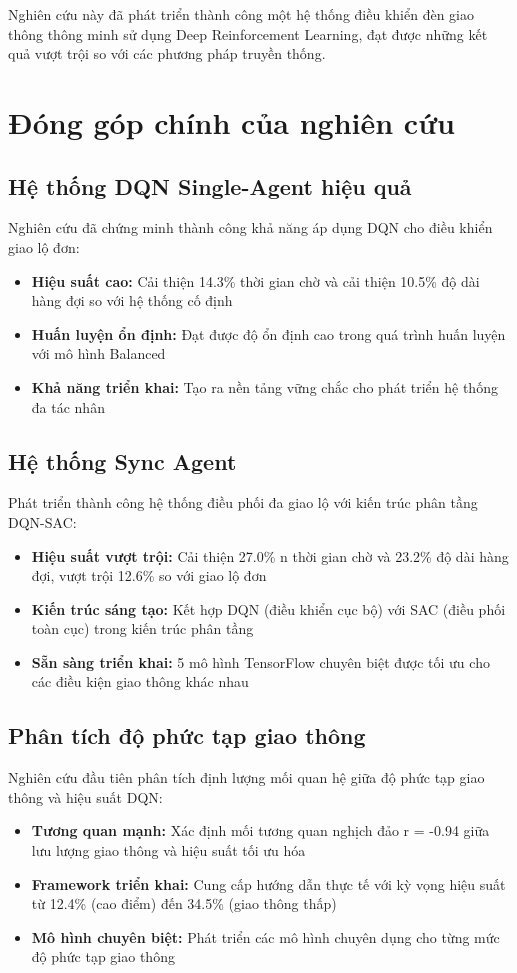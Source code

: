 Nghiên cứu này đã phát triển thành công một hệ thống điều khiển đèn giao thông thông minh sử dụng Deep Reinforcement Learning, đạt được những kết quả vượt trội so với các phương pháp truyền thống.

\section{Đóng góp chính của nghiên cứu}

\subsection{Hệ thống DQN Single-Agent hiệu quả}
Nghiên cứu đã chứng minh thành công khả năng áp dụng DQN cho điều khiển giao lộ đơn:
\begin{itemize}
    \item \textbf{Hiệu suất cao:} Cải thiện 14.3\% thời gian chờ và cải thiện 10.5\% độ dài hàng đợi so với hệ thống cố định
    \item \textbf{Huấn luyện ổn định:} Đạt được độ ổn định cao trong quá trình huấn luyện với mô hình Balanced
    \item \textbf{Khả năng triển khai:} Tạo ra nền tảng vững chắc cho phát triển hệ thống đa tác nhân
\end{itemize}

\subsection{Hệ thống Sync Agent}
Phát triển thành công hệ thống điều phối đa giao lộ với kiến trúc phân tầng DQN-SAC:
\begin{itemize}
    \item \textbf{Hiệu suất vượt trội:} Cải thiện 27.0\% n thời gian chờ và 23.2\% độ dài hàng đợi, vượt trội 12.6\% so với giao lộ đơn
    \item \textbf{Kiến trúc sáng tạo:} Kết hợp DQN (điều khiển cục bộ) với SAC (điều phối toàn cục) trong kiến trúc phân tầng
    \item \textbf{Sẵn sàng triển khai:} 5 mô hình TensorFlow chuyên biệt được tối ưu cho các điều kiện giao thông khác nhau
\end{itemize}

\subsection{Phân tích độ phức tạp giao thông}
Nghiên cứu đầu tiên phân tích định lượng mối quan hệ giữa độ phức tạp giao thông và hiệu suất DQN:
\begin{itemize}
    \item \textbf{Tương quan mạnh:} Xác định mối tương quan nghịch đảo r = -0.94 giữa lưu lượng giao thông và hiệu suất tối ưu hóa
    \item \textbf{Framework triển khai:} Cung cấp hướng dẫn thực tế với kỳ vọng hiệu suất từ 12.4\% (cao điểm) đến 34.5\% (giao thông thấp)
    \item \textbf{Mô hình chuyên biệt:} Phát triển các mô hình chuyên dụng cho từng mức độ phức tạp giao thông
\end{itemize}



